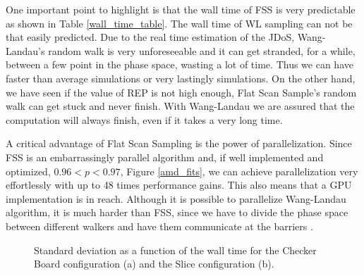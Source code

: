 	One important point to highlight is that the wall time of FSS is very predictable as shown in Table \ref{wall_time_table}. The wall time of WL sampling can not be that easily predicted. Due to the real time estimation of the JDoS, Wang-Landau's random walk is very unforeseeable and it can get stranded, for a while, between a few point in the phase space, wasting a lot of time. Thus we can have faster than average simulations or very lastingly simulations. 
	On the other hand, we have seen if the value of REP is not high enough, Flat Scan Sample's random walk can get stuck and never finish. With Wang-Landau we are assured that the computation will always finish, even if it takes a very long time.

	A critical advantage of Flat Scan Sampling is the power of parallelization. Since FSS is an embarrassingly parallel algorithm and, if well implemented and optimized, $0.96<p<0.97$, Figure \ref{amd_fits}, we can achieve parallelization very effortlessly with up to 48 times performance gains. This also means that a GPU implementation is in reach. Although it is possible to parallelize Wang-Landau algorithm, it is much harder than FSS, since we have to divide the phase space between different walkers and have them communicate at the barriers \cite{Yin2012}.

\begin{figure}[h]
	\centering
	\caption{Standard deviation as a function of the wall time for the Checker Board configuration (a) and the Slice configuration (b).}
\end{figure}




